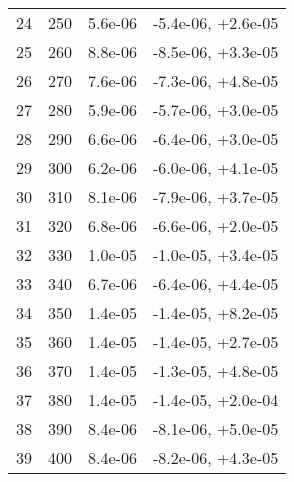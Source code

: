 \begin{table}
\begin{adjustbox}{width=1\textwidth/2}
\begin{tabular}{|c|c|c|c|}
\cline{1-4}
24 & 250 & 5.6e-06 & -5.4e-06, +2.6e-05 \\
\cline{1-4}
25 & 260 & 8.8e-06 & -8.5e-06, +3.3e-05 \\
\cline{1-4}
26 & 270 & 7.6e-06 & -7.3e-06, +4.8e-05 \\
\cline{1-4}
27 & 280 & 5.9e-06 & -5.7e-06, +3.0e-05 \\
\cline{1-4}
28 & 290 & 6.6e-06 & -6.4e-06, +3.0e-05 \\
\cline{1-4}
29 & 300 & 6.2e-06 & -6.0e-06, +4.1e-05 \\
\cline{1-4}
30 & 310 & 8.1e-06 & -7.9e-06, +3.7e-05 \\
\cline{1-4}
31 & 320 & 6.8e-06 & -6.6e-06, +2.0e-05 \\
\cline{1-4}
32 & 330 & 1.0e-05 & -1.0e-05, +3.4e-05 \\
\cline{1-4}
33 & 340 & 6.7e-06 & -6.4e-06, +4.4e-05 \\
\cline{1-4}
34 & 350 & 1.4e-05 & -1.4e-05, +8.2e-05 \\
\cline{1-4}
35 & 360 & 1.4e-05 & -1.4e-05, +2.7e-05 \\
\cline{1-4}
36 & 370 & 1.4e-05 & -1.3e-05, +4.8e-05 \\
\cline{1-4}
37 & 380 & 1.4e-05 & -1.4e-05, +2.0e-04 \\
\cline{1-4}
38 & 390 & 8.4e-06 & -8.1e-06, +5.0e-05 \\
\cline{1-4}
39 & 400 & 8.4e-06 & -8.2e-06, +4.3e-05 \\
\cline{1-4}
\end{tabular}
\end{adjustbox}
\end{table}


